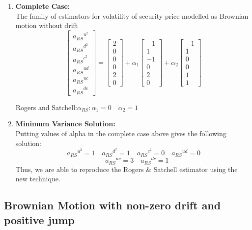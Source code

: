 \documentclass[12pt]{article}   	%
\begin{document}
\begin{enumerate}
\item \textbf{Complete Case:}\\
The family of estimators for volatility of security price modelled as Brownian motion without drift
$$\begin{bmatrix}
{a_{RS}}^{u^2}\\
{a_{RS}}^{d^2}\\
{a_{RS}}^{c^2}\\
{a_{RS}}^{ud}\\
{a_{RS}}^{uc}\\
{a_{RS}}^{dc}
\end{bmatrix}=
\begin{bmatrix}
2\\
0\\
0\\
0\\
2\\
0
\end{bmatrix}+\alpha_1
\begin{bmatrix}
-1\\
1\\
-1\\
0\\
2\\
0
\end{bmatrix}+\alpha_2
\begin{bmatrix}
-1\\
1\\
0\\
0\\
1\\
1
\end{bmatrix}
 $$
 
Rogers and Satchell:\quad $\alpha_{RS}: \alpha_1=0\quad \alpha_2=1$

\item \textbf{Minimum Variance Solution:}\\
Putting values of alpha in the complete case above gives the following solution:\\
$${a_{RS}}^{u^2}=1\quad{a_{RS}}^{d^2}=1\quad{a_{RS}}^{c^2}=0\quad{a_{RS}}^{ud}=0$$
$$\quad{a_{RS}}^{uc}=3\quad{a_{RS}}^{dc}=1$$
Thus, we are able to reproduce the Rogers \& Satchell estimator using the new technique.
\end{enumerate}

\subsection{Brownian Motion with non-zero drift and positive jump}
\end{document}
